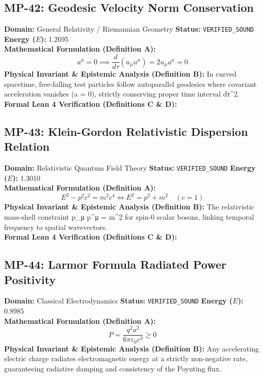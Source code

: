 \subsection{MP-42: Geodesic Velocity Norm Conservation}
\textbf{Domain:} General Relativity / Riemannian Geometry \hfill \textbf{Status:} \texttt{VERIFIED\_SOUND} \hfill \textbf{Energy ($E$):} 1.2695\\
\textbf{Mathematical Formulation (Definition A):}
\begin{equation*}
a^\mu = 0 \implies \frac{d}{d\tau}(u_\mu u^\mu) = 2 u_\mu a^\mu = 0
\end{equation*}
\textbf{Physical Invariant \& Epistemic Analysis (Definition B):}
In curved spacetime, free-falling test particles follow autoparallel geodesics where covariant acceleration vanishes (a = 0), strictly conserving proper time interval dτ\textasciicircum{}2.\\

\textbf{Formal Lean 4 Verification (Definitions C \& D):}


\vspace{1em}
\subsection{MP-43: Klein-Gordon Relativistic Dispersion Relation}
\textbf{Domain:} Relativistic Quantum Field Theory \hfill \textbf{Status:} \texttt{VERIFIED\_SOUND} \hfill \textbf{Energy ($E$):} 1.3010\\
\textbf{Mathematical Formulation (Definition A):}
\begin{equation*}
E^2 - p^2 c^2 = m^2 c^4 \iff E^2 = p^2 + m^2 \quad (c=1)
\end{equation*}
\textbf{Physical Invariant \& Epistemic Analysis (Definition B):}
The relativistic mass-shell constraint p\_μ p\textasciicircum{}μ = m\textasciicircum{}2 for spin-0 scalar bosons, linking temporal frequency to spatial wavevectors.\\

\textbf{Formal Lean 4 Verification (Definitions C \& D):}


\vspace{1em}
\subsection{MP-44: Larmor Formula Radiated Power Positivity}
\textbf{Domain:} Classical Electrodynamics \hfill \textbf{Status:} \texttt{VERIFIED\_SOUND} \hfill \textbf{Energy ($E$):} 0.8985\\
\textbf{Mathematical Formulation (Definition A):}
\begin{equation*}
P = \frac{q^2 a^2}{6\pi \varepsilon_0 c^3} \ge 0
\end{equation*}
\textbf{Physical Invariant \& Epistemic Analysis (Definition B):}
Any accelerating electric charge radiates electromagnetic energy at a strictly non-negative rate, guaranteeing radiative damping and consistency of the Poynting flux.\\

